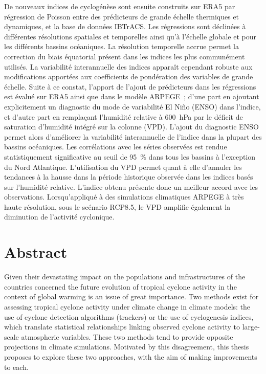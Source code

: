 \documentclass[12pt,twoside,openright]{book}
\newcommand{\hPa}[1]{\SI{#1}{\hecto\pascal}}
\newcommand{\prct}[1]{\SI{#1}{\percent}}
\begin{document}
De nouveaux indices de cyclogénèse sont ensuite construits sur ERA5 par régression de Poisson entre des prédicteurs de grande échelle thermiques et dynamiques,
et la base de données IBTrACS. Les régressions sont déclinées à différentes résolutions spatiales et temporelles ainsi qu’à l’échelle globale et pour les
différents bassins océaniques. La résolution temporelle accrue permet la correction du biais équatorial présent dans les indices les plus communément utilisés.
La variabilité interannuelle des indices apparaît cependant robuste aux modifications apportées aux coefficients de pondération des variables de grande échelle.
Suite à ce constat, l’apport de l’ajout de prédicteurs dans les régressions est évalué sur ERA5 ainsi que dans le modèle ARPEGE ; d’une part en ajoutant
explicitement un diagnostic du mode de variabilité El Niño (ENSO) dans l’indice, et d’autre part en remplaçant l’humidité relative à \hPa{600} par le déficit
de saturation d’humidité intégré sur la colonne (VPD). L’ajout du diagnostic ENSO permet alors d’améliorer la variabilité interannuelle de l’indice dans la
plupart des bassins océaniques. Les corrélations avec les séries observées est rendue statistiquement significative au seuil de \prct{95} dans tous les bassins
à l’exception du Nord Atlantique. L’utilisation du VPD permet quant à elle d’annuler les tendances à la hausse dans la période historique observée dans les
indices basés sur l’humidité relative. L’indice obtenu présente donc un meilleur accord avec les observations. Lorsqu’appliqué à des simulations climatiques
ARPEGE à très haute résolution, sous le scénario RCP8.5, le VPD amplifie également la diminution de l’activité cyclonique.

\chapter*{Abstract}

Given their devastating impact on the populations and infrastructures of the countries concerned the future evolution of tropical cyclone activity in the
context of global warming is an issue of great importance. Two methods exist for assessing tropical cyclone activity under climate change in climate models: the
use of cyclone detection algorithms (trackers) or the use of cyclogenesis indices, which translate statistical relationships linking observed cyclone activity
to large-scale atmospheric variables. These two methods tend to provide opposite projections in climate simulations. Motivated by this disagreement, this thesis
proposes to explore these two approaches, with the aim of making improvements to each.
\end{document}
